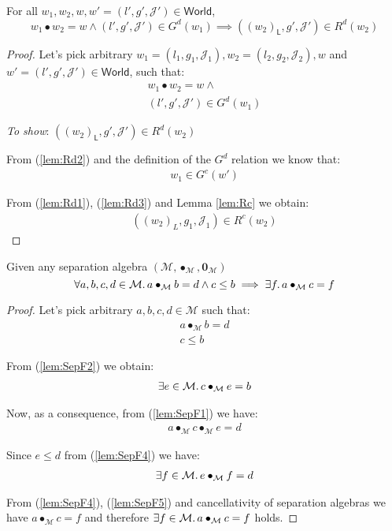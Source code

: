 \lem \label{lem:Rd}  For all $w_1, w_2, w, w' = (l', g', \mathcal{J}') \in \mathsf{World}$,
\[
	w_1 \bullet w_2 = w \land (l', g', \mathcal{J}') \in G^d(w_1) \implies ((w_2)_\mathsf{L}, g', \mathcal{J}') \in R^d(w_2)
\]

{\parindent0pt
\begin{proof}
Let's pick arbitrary $w_1 = (l_1, g_1, \mathcal{J}_1), w_2 = (l_2, g_2, \mathcal{J}_2), w$ and $w' = (l', g', \mathcal{J}') \in \mathsf{World}$, such that:
\begin{gather}
	\label{lem:Rd1} w_1 \bullet w_2 = w \land \\
	\label{lem:Rd2} (l', g', \mathcal{J}') \in G^d(w_1)
\end{gather}

\textit{To show}: $((w_2)_\mathsf{L}, g', \mathcal{J}') \in R^d(w_2)$

From (\ref{lem:Rd2}) and the definition of the $G^d$ relation we know that:
\begin{gather}
	\label{lem:Rd3} w_1 \in G^c(w')
\end{gather}

From (\ref{lem:Rd1}), (\ref{lem:Rd3}) and Lemma \ref{lem:Rc} we obtain:
\begin{gather}
	\label{lem:Rd4} ((w_2)_L, g_1, \mathcal{J}_1) \in R^c(w_2)
\end{gather}
\end{proof}
}

\lem \label{lem:SepF} Given any separation algebra $(\mathcal{M}, \bullet_\mathcal{M}, \mathbf{0}_\mathcal{M})$
\[
	\forall a, b, c, d \in \mathcal{M} \ldotp a \bullet_\mathcal{M} b = d \land c \leq b \implies \exists f \ldotp a \bullet_\mathcal{M} c = f
\]

{\parindent0pt
\begin{proof}
Let's pick arbitrary $a, b, c, d \in \mathcal{M}$ such that:
\begin{gather}
	\label{lem:SepF1} a \bullet_\mathcal{M} b = d
	\\
	\label{lem:SepF2} c \leq b
\end{gather}

From (\ref{lem:SepF2}) we obtain:
\begin{gather}
	\label{lem:SepF3} \exists e \in \mathcal{M} \ldotp c \bullet_\mathcal{M} e = b
\end{gather}

Now, as a consequence, from (\ref{lem:SepF1}) we have:
\begin{gather}
	\label{lem:SepF4} a \bullet_\mathcal{M} c \bullet_\mathcal{M} e = d
\end{gather}

Since $e \leq d$ from (\ref{lem:SepF4}) we have:
\begin{gather}
	\label{lem:SepF5} \exists f \in \mathcal{M} \ldotp e \bullet_\mathcal{M} f = d
\end{gather}

From (\ref{lem:SepF4}), (\ref{lem:SepF5}) and cancellativity of separation algebras we have $a \bullet_\mathcal{M} c = f$ and therefore $\exists f \in \mathcal{M} \ldotp a \bullet_\mathcal{M} c = f$ holds.
\end{proof}
}